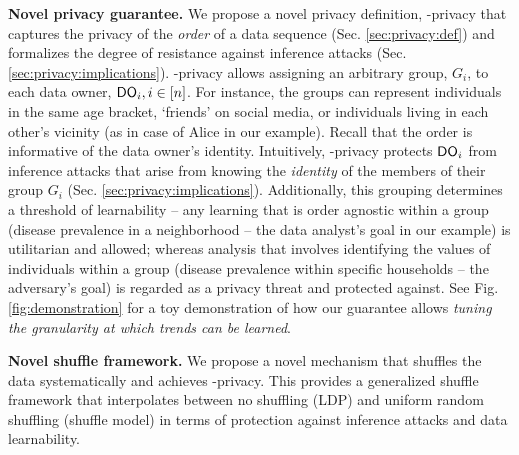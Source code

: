     \item \textbf{Novel privacy guarantee.} We propose a novel privacy definition, \name-privacy that captures the privacy of the \textit{order} of a data sequence (Sec. \ref{sec:privacy:def}) and formalizes the degree of resistance against inference attacks (Sec. \ref{sec:privacy:implications}). \name-privacy allows assigning an arbitrary group, $G_i$, to each data owner, $\textsf{DO}_i, i \in [n]$. For instance, the groups can represent individuals in the same age bracket, `friends' on social media, or individuals living in each other's vicinity (as in case of Alice in our example).  Recall that the order is informative of the data owner's identity. Intuitively,  \name-privacy protects $\textsf{DO}_i$ from inference attacks that arise from knowing the \textit{identity} of the members of their group $G_i$ (Sec. \ref{sec:privacy:implications}). %
    Additionally, this grouping determines a threshold of learnability -- any learning that is order agnostic within a group (disease prevalence in a neighborhood -- the data analyst's goal in our example) is utilitarian and allowed; whereas analysis that involves identifying the values of individuals within a group (disease prevalence within specific households -- the adversary's goal) is regarded as a privacy threat and protected against.
 See Fig. \ref{fig:demonstration} for a toy demonstration of how our guarantee allows \textit{tuning the granularity at which trends can be learned}. 
    
    \item \textbf{Novel shuffle framework.} We  propose a novel mechanism that shuffles the data systematically and achieves \name-privacy. This 
   provides a generalized shuffle framework that interpolates between no shuffling (\textsf{LDP}) and uniform random shuffling (shuffle model) in terms of protection against inference attacks and data learnability.
\squishendfour 
  \vspace{-0.4cm} 
